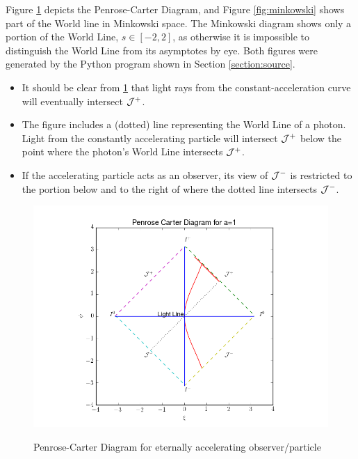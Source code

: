 \documentclass[]{article}
\begin{document}
Figure \ref{fig:penrose-carter} depicts the Penrose-Carter Diagram, and Figure \ref{fig:minkowski} shows part of the World line in Minkowski space. The Minkowski diagram shows only a portion of the World Line, $s\in [-2,2]$, as otherwise it is impossible to distinguish the World Line from its asymptotes by eye. Both figures were generated by the Python program shown in Section \ref{section:source}.
\begin{itemize}
	\item It should be clear from \ref{fig:penrose-carter} that light rays from the constant-acceleration curve will eventually intersect $\cal{J}^+$.
	\item The figure includes a (dotted) line representing the World Line of a photon. Light from the constantly accelerating particle will intersect  $\cal{J}^+$ below the point where the photon's World Line intersects  $\cal{J}^+$.
	\item If the accelerating particle acts as an observer, its view of  $\cal{J}^-$ is restricted to the portion below and to the right of where the dotted line intersects $\cal{J}^-$.
\end{itemize}
\begin{figure}[H]
	\caption{Penrose-Carter Diagram for eternally accelerating observer/particle}
	\centering
	\includegraphics[width=1.0\textwidth]{GR-Problem-5-1-2.png}
	\label{fig:penrose-carter}
\end{figure}
\end{document}
